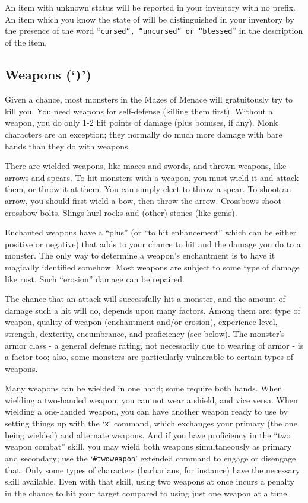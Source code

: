 An item with unknown status will be reported in your inventory with no prefix.
An item which you know the state of will be distinguished in your inventory
by the presence of the word ``{\tt cursed'', ``uncursed'' or ``blessed}'' in the
description of the item.
\subsection*{Weapons (`{\tt )}')}

Given a chance, most monsters in the Mazes of Menace will gratuitously try to
kill you.  You need weapons for self-defense (killing them first).  Without a
weapon, you do only 1-2 hit points of damage (plus bonuses, if any).
Monk characters are an exception; they normally do much more damage with
bare hands than they do with weapons.

There are wielded weapons, like maces and swords, and thrown weapons,
like arrows and spears.  To hit monsters with a weapon, you must wield it and
attack them, or throw it at them.  You can simply elect to throw a spear.
To shoot an arrow, you should first wield a bow, then throw the arrow.
Crossbows shoot crossbow bolts.  Slings hurl rocks and (other) stones
(like gems).

Enchanted weapons have a ``plus'' (or ``to hit enhancement'' which can be
either positive or negative) that adds to your chance to
hit and the damage you do to a monster.  The only way to determine a weapon's
enchantment is to have it magically identified somehow.
Most weapons are subject to some type of damage like rust.  Such
``erosion'' damage can be repaired.

The chance that an attack will successfully hit a monster, and the amount
of damage such a hit will do, depends upon many factors.  Among them are:
type of weapon, quality of weapon (enchantment and/or erosion), experience
level, strength, dexterity, encumbrance, and proficiency (see below).  The
monster's armor class - a general defense rating, not necessarily due to
wearing of armor - is a factor too; also, some monsters are particularly
vulnerable to certain types of weapons.

Many weapons can be wielded in one hand; some require both hands.
When wielding a two-handed weapon, you can not wear a shield, and
vice versa.  When wielding a one-handed weapon, you can have another
weapon ready to use by setting things up with the `{\tt x}' command, which
exchanges your primary (the one being wielded) and alternate weapons.
And if you have proficiency in the ``two weapon combat'' skill, you
may wield both weapons simultaneously as primary and secondary; use the
`{\tt \#twoweapon}' extended command to engage or disengage that.  Only
some types of characters (barbarians, for instance) have the necessary
skill available.  Even with that skill, using two weapons at once incurs
a penalty in the chance to hit your target compared to using just one
weapon at a time.

